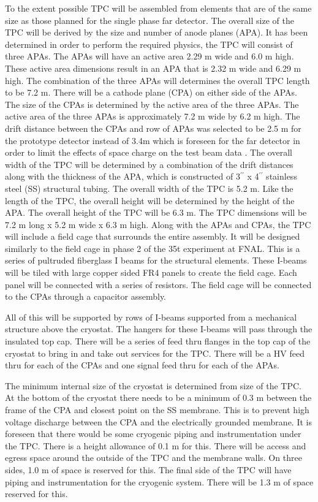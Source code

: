 To the extent possible TPC will be assembled from elements that are of the same size as those planned for the single phase far detector.  The overall size of the TPC will be derived by the size and number of anode planes (APA).  It has been determined in order to perform the required physics, the TPC will consist of three APAs.  The APAs will have an active area 2.29 m wide and 6.0 m high.  These active area dimensions result in an APA that is 2.32 m wide and 6.29 m high.  The combination of the three APAs will determines the overall TPC length to be 7.2 m.  There will be a cathode plane (CPA) on either side of the APAs.  The size of the CPAs is determined by the active area of the three APAs.  The active area of the three APAs is approximately 7.2 m wide by 6.2 m high.  The drift distance between the CPAs and row of APAs was selected to be 2.5 m for the prototype detector instead of 3.4m which is foreseen for the far detector in order to limit the effects of space charge on the test beam data .  The overall width of the TPC will be determined by a combination of the drift distances along with the thickness of the APA, which is constructed of 3$^{\prime\prime}$ x 4$^{\prime\prime}$ stainless steel (SS) structural tubing.  The overall width of the TPC is 5.2 m.  Like the length of the TPC, the overall height will be determined by the height of the APA.  The overall height of the TPC will be 6.3 m.  The TPC dimensions will be 7.2 m long x 5.2 m wide x 6.3 m high. Along with the APAs and CPAs, the TPC will include a field cage that surrounds the entire assembly.  It will be designed similarly to the field cage in phase 2 of the 35t experiment at FNAL.  This is a series of pultruded fiberglass I beams for the structural elements.  These I-beams will be tiled with large copper sided FR4 panels to create the field cage.  Each panel will be connected with a series of resistors.  The field cage will be connected to the CPAs through a capacitor assembly.

All of this will be supported by rows of I-beams supported from a mechanical structure above the cryostat.  The hangers for these I-beams will pass through the insulated top cap.  There will be a series of feed thru flanges in the top cap of the cryostat to bring in and take out services for the TPC.  There will be a HV feed thru for each of the CPAs and one signal feed thru for each of the APAs.


The minimum internal size of the cryostat is determined from size of the TPC.  At the bottom of the 
cryostat there needs to be a minimum of 0.3 m between the frame of the CPA and closest point on the SS membrane.  This is to prevent high voltage discharge between the CPA and the electrically grounded membrane. It is foreseen that there would be some cryogenic piping and instrumentation under the TPC.  There is a height allowance of 0.1 m for this.  There will be access and egress space around the outside of the TPC and the membrane walls.  On three sides, 1.0 m of space is reserved for this.  The final side of the TPC will have piping and instrumentation for the cryogenic system.  There will be 1.3 m of space reserved for this.  

